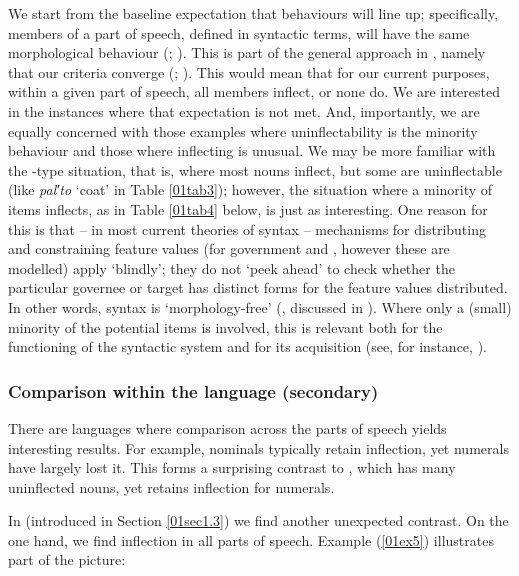 \documentclass[output=paper,colorlinks,citecolor=brown]{langscibook}
\begin{document}
We start from the baseline expectation that behaviours will line up; specifically, members of a part of speech, defined in syntactic terms, will have the same morphological behaviour (\citealt[101]{spencer2005}; \citealt{corbett2013}). This is part of the general approach in , namely that our criteria converge (\citealt[9]{brownchumakina2013}; \citealt[527]{corbettfedden2016}). This would mean that for our current purposes, within a given part of speech, all members inflect, or none do. We are interested in the instances where that expectation is not met. And, importantly, we are equally concerned with those examples where uninflectability is the minority behaviour and those where inflecting is unusual. We may be more familiar with the -type situation, that is, where most nouns inflect, but some are uninflectable (like \textit{pal′to} `coat' in Table \ref{01tab3}); however, the situation where a minority of items inflects, as in Table \ref{01tab4} below, is just as interesting. One reason for this is that -- in most current theories of syntax -- mechanisms for distributing and constraining feature values (for government and , however these are modelled) apply `blindly'; they do not `peek ahead' to check whether the particular governee or  target has distinct forms for the feature values distributed. In other words, syntax is `morphology-free' (\citealt[301]{zwicky1996}, discussed in \citealt{corbett2009}). Where only a (small) minority of the potential items is involved, this is relevant both for the functioning of the syntactic system and for its acquisition (see, for instance, \citealt[111--117]{chumakinabond2016}).

\subsubsection{Comparison within the language (secondary)} \label{01sec3.1.2}

There are languages where comparison across the parts of speech yields interesting results. For example,  nominals typically retain inflection, yet numerals have largely lost it. This forms a surprising contrast to , which has many uninflected nouns, yet retains inflection for numerals.

In  (introduced in Section \ref{01sec1.3}) we find another unexpected contrast. On the one hand, we find inflection in all parts of speech. Example (\ref{01ex5}) illustrates part of the picture:
\end{document}
